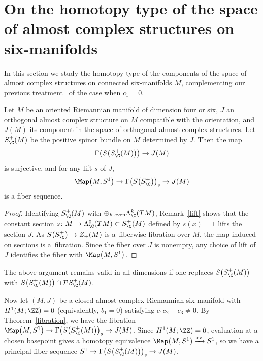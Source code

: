 \section[On the homotopy type of the space of almost complex structures on six-manifolds]{On the homotopy type of the space\\ of almost complex structures on six-manifolds}

In this section we study the homotopy type of the components of the space of almost complex structures on connected six-manifolds $M$, complementing our previous treatment~\cite{FGM21} of the case when $c_1=0$.

\begin{Theorem}\label{fibration}
Let $M$ be an oriented Riemannian manifold of dimension four or six, $J$ an orthogonal almost complex structure on $M$ compatible with the orientation, and $J(M)$ its component in the space of orthogonal almost complex structures. Let $S_{\C}^+(M)$ be the positive spinor bundle on $M$ determined by $J$. Then the map
\[
\Gamma\big( S\big(S_\C^+(M)\big)\big) \to J(M)
\]
is surjective, and for any lift $s$ of $J$,
\[
\Map\big(M,S^1\big) \to \Gamma\big( S\big(S_\C^+\big)\big)_s \to J(M)
\]
is a fiber sequence.
\end{Theorem}
\begin{proof}
Identifying $S_\C^+(M)$ with $\oplus_{k \text{ even}} \Lambda^k_\C(TM)$, Remark~\ref{lift} shows that
the constant section $s \colon M \to \Lambda^0_\C(TM) \subset S_\C^+(M)$ defined by
$s(x)=1$ lifts the section $J$. As $S\big(S_\C^+\big) \to Z_+(M)$ is a~fiberwise fibration over $M$, the map induced on sections is a~fibration. Since the fiber over $J$ is nonempty, any choice of lift of $J$ identifies the
fiber with $\Map\big(M,S^1\big)$.
\end{proof}

\begin{Remark} The above argument remains valid in all dimensions if one replaces $S\big(S_{\C}^+(M)\big)$ with $S\big(S_{\C}^+(M)\big) \cap {\mathcal P}S ^+_{\C}(M)$. \end{Remark}

Now let $(M,J)$ be a closed almost complex Riemannian six-manifold with $H^1(M;\ZZ) = 0$ (equivalently, $b_1 = 0$) satisfying $c_1c_2 - c_3 \neq 0$. By Theorem~\ref{fibration}, we have the fibration $\Map\big(M,S^1\big) \to \Gamma\big( S\big(S_\C^+(M)\big)\big)_s \to J(M)$. Since $H^1(M;\ZZ) = 0$, evaluation at a chosen basepoint gives a homotopy equivalence $\Map\big(M,S^1\big) \xrightarrow{{\rm ev}} S^1$, so we have a principal fiber sequence $S^1 \to \Gamma\big(S\big(S_\C^+(M)\big)\big)_s \to J(M)$.

